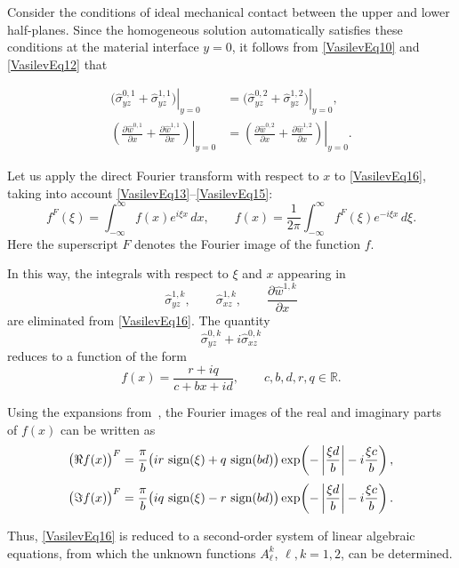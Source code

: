 Consider the conditions of ideal mechanical contact between the upper and lower half-planes. Since the homogeneous solution automatically satisfies these conditions at the material interface \(y=0\), it follows from \eqref{VasilevEq10} and \eqref{VasilevEq12} that

\begin{equation}
\begin{aligned}
	\left.
	\bigl(
	\widehat{\sigma}_{yz}^{0,1}
	+
	\widehat{\sigma}_{yz}^{1,1}
	\bigr)
	\right|_{y=0}
	&=
	\left.
	\bigl(
	\widehat{\sigma}_{yz}^{0,2}
	+
	\widehat{\sigma}_{yz}^{1,2}
	\bigr)
	\right|_{y=0},
	\\[2pt]
	\left.
	\left(
	\frac{\partial \widehat{w}^{0,1}}{\partial x}
	+
	\frac{\partial \widehat{w}^{1,1}}{\partial x}
	\right)
	\right|_{y=0}
	&=
	\left.
	\left(
	\frac{\partial \widehat{w}^{0,2}}{\partial x}
	+
	\frac{\partial \widehat{w}^{1,2}}{\partial x}
	\right)
	\right|_{y=0}.
	\end{aligned}
	\label{VasilevEq16}
\end{equation}

Let us apply the direct Fourier transform with respect to \(x\) to \eqref{VasilevEq16}, taking into account \eqref{VasilevEq13}--\eqref{VasilevEq15}:
\[
f^{F}(\xi)=\int_{-\infty}^{\infty} f(x)e^{i\xi x}\,dx,
\qquad
f(x)=\frac{1}{2\pi}\int_{-\infty}^{\infty} f^{F}(\xi)e^{-i\xi x}\,d\xi.
\]
Here the superscript \(F\) denotes the Fourier image of the function \(f\).

In this way, the integrals with respect to \(\xi\) and \(x\) appearing in
\[
\widehat{\sigma}_{yz}^{1,k},
\qquad
\widehat{\sigma}_{xz}^{1,k},
\qquad
\frac{\partial \widehat{w}^{1,k}}{\partial x}
\]
are eliminated from \eqref{VasilevEq16}. The quantity
\[
\widehat{\sigma}_{yz}^{0,k}+i\widehat{\sigma}_{xz}^{0,k}
\]
reduces to a function of the form
\[
f(x)=\frac{r+iq}{c+bx+id},
\qquad
c,b,d,r,q\in\mathbb{R}.
\]

Using the expansions from~\cite[\S\,13.5]{Vasilev25}, the Fourier images of the real and imaginary parts of \(f(x)\) can be written as~\cite{Vasilev27}
\[
\bigl(\Re f(x)\bigr)^{F}
=
\frac{\pi}{b}
\bigl(
ir\,\operatorname{sign}(\xi)+q\,\operatorname{sign}(bd)
\bigr)
\exp\!\left(
-\left|\frac{\xi d}{b}\right|
-i\frac{\xi c}{b}
\right),
\]
\[
\bigl(\Im f(x)\bigr)^{F}
=
\frac{\pi}{b}
\bigl(
iq\,\operatorname{sign}(\xi)-r\,\operatorname{sign}(bd)
\bigr)
\exp\!\left(
-\left|\frac{\xi d}{b}\right|
-i\frac{\xi c}{b}
\right).
\]

Thus, \eqref{VasilevEq16} is reduced to a second-order system of linear algebraic equations, from which the unknown functions \(A_\ell^k\), \(\ell,k=1,2\), can be determined.

